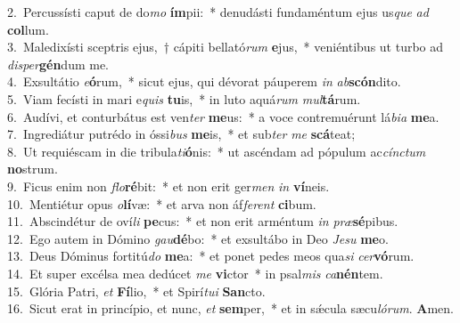 {2.~}Percussísti caput de do\textit{mo} \textbf{ím}pii:~* denudásti fundaméntum ejus us\textit{que} \textit{ad} \textbf{col}lum.\\
{3.~}Maledixísti sceptris ejus,~† cápiti bellató\textit{rum} \textbf{e}jus,~* veniéntibus ut turbo ad \textit{di}\textit{sper}\textbf{gén}dum me.\\
{4.~}Exsultátio \textit{e}\textbf{ó}rum,~* sicut ejus, qui dévorat páuperem \textit{in} \textit{ab}\textbf{scón}dito.\\
{5.~}Viam fecísti in mari e\textit{quis} \textbf{tu}is,~* in luto aquá\textit{rum} \textit{mul}\textbf{tá}rum.\\
{6.~}Audívi, et conturbátus est ven\textit{ter} \textbf{me}us:~* a voce contremuérunt lá\textit{bi}\textit{a} \textbf{me}a.\\
{7.~}Ingrediátur putrédo in óssi\textit{bus} \textbf{me}is,~* et sub\textit{ter} \textit{me} \textbf{scá}teat;\\
{8.~}Ut requiéscam in die tribula\textit{ti}\textbf{ó}nis:~* ut ascéndam ad pópulum ac\textit{cín}\textit{ctum} \textbf{no}strum.\\
{9.~}Ficus enim non \textit{flo}\textbf{ré}bit:~* et non erit ger\textit{men} \textit{in} \textbf{ví}neis.\\
{10.~}Mentiétur opus \textit{o}\textbf{lí}væ:~* et arva non áf\textit{fe}\textit{rent} \textbf{ci}bum.\\
{11.~}Abscindétur de oví\textit{li} \textbf{pe}cus:~* et non erit arméntum \textit{in} \textit{præ}\textbf{sé}pibus.\\
{12.~}Ego autem in Dómino \textit{gau}\textbf{dé}bo:~* et exsultábo in Deo \textit{Je}\textit{su} \textbf{me}o.\\
{13.~}Deus Dóminus fortitú\textit{do} \textbf{me}a:~* et ponet pedes meos qua\textit{si} \textit{cer}\textbf{vó}rum.\\
{14.~}Et super excélsa mea dedúcet \textit{me} \textbf{vi}ctor~* in psal\textit{mis} \textit{ca}\textbf{nén}tem.\\
{15.~}Glória Patri, \textit{et} \textbf{Fí}lio,~* et Spirí\textit{tu}\textit{i} \textbf{San}cto.\\
{16.~}Sicut erat in princípio, et nunc, \textit{et} \textbf{sem}per,~* et in sǽcula sæcu\textit{ló}\textit{rum}. \textbf{A}men.\\

